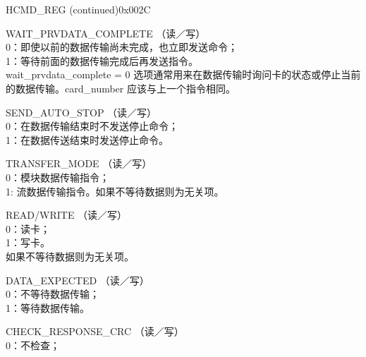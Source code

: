 \begin{register}{H}{CMD\_REG (continued)}{0x002C}
%
%
%
%
%
%
%
%
%
%
%
%
%
%
%
%
%
%
%
%
%
%
%
\regnewline%
\begin{regdesc}\begin{reglist}
\item [WAIT\_PRVDATA\_COMPLETE] （读／写）\\
0：即使以前的数据传输尚未完成，也立即发送命令；\\
1：等待前面的数据传输完成后再发送指令。\\
wait\_prvdata\_complete = 0 选项通常用来在数据传输时询问卡的状态或停止当前的数据传输。card\_number 应该与上一个指令相同。
\item [SEND\_AUTO\_STOP] （读／写）\\
0：在数据传输结束时不发送停止命令；\\
1：在数据传送结束时发送停止命令。
\item [TRANSFER\_MODE] （读／写） \\
0：模块数据传输指令；\\
1: 流数据传输指令。如果不等待数据则为无关项。
\item [READ/WRITE] （读／写）\\
0：读卡；\\
1：写卡。\\
如果不等待数据则为无关项。
\item [DATA\_EXPECTED] （读／写）\\
0：不等待数据传输；\\
1：等待数据传输。\\
\item [CHECK\_RESPONSE\_CRC]（读／写）\\
0：不检查；\\

\end{reglist}
\end{regdesc}
\end{register}
